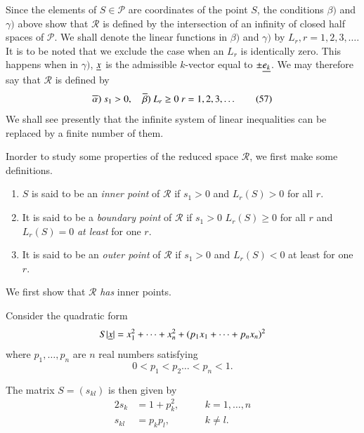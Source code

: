 Since the elements of $S\in\mathscr{P}$ are coordinates of the point
$S$, the conditions $\beta)$ and $\gamma)$ above show that
$\mathscr{R}$ is defined by the intersection of an infinity of closed
half spaces of $\mathscr{P}$. We shall denote the linear functions in
$\beta)$ and $\gamma)$ by $L_{r},r=1,2,3,\ldots$. It is to be noted
that we exclude the case when an $L_{r}$ is identically zero. This
happens when in $\gamma)$, $\underline{x}$ is the admissible $k$-vector equal
to $\pm \underline{e_{k}}$. We may therefore say that $\mathscr{R}$ is
defined by
\begin{equation*}
\overline{\alpha})~s_{1} > 0, \quad \overline{\beta})~L_{r}\geq 0
\ r=1,2,3,\ldots\tag{57}\label{c2:eq57} 
\end{equation*}
We shall see presently that the infinite system of linear inequalities
can be replaced by a finite number of them.

In\pageoriginale order to study some properties of the reduced space
$\mathscr{R}$, we first make some definitions.

\begin{defi*}
\begin{enumerate}
\renewcommand{\theenumi}{\roman{enumi}}
\renewcommand{\labelenumi}{\theenumi)}
\item $S$ is said to be an {\em inner point} of $\mathscr{R}$ if
  $s_{1}>0$ and $L_{r}(S)>0$ for all $r$.

\item It is said to be a {\em boundary point} of $\mathscr{R}$ if
  $s_{1}>0$ $L_{r}(S)\geq 0$ for all $r$ and $L_{r}(S)=0$ {\em at
  least} for one $r$.

\item It is said to be an {\em outer point} of $\mathscr{R}$ if
  $s_{1}>0$ and $L_{r}(S)<0$ at least for one $r$.
\end{enumerate}
\end{defi*}

We first show that $\mathscr{R}$ {\em has} inner points.

Consider the quadratic form 
$$
S|\underline{x}|=x_{1}^{2}+\cdots+x_{n}^{2}+(p_{1}x_{1}+\cdots+p_{n}x_{n})^{2}
$$
where $p_{1},\ldots,p_{n}$ are $n$ real numbers satisfying
$$
0<p_{1}<p_{2}\ldots <p_{n}<1.
$$

The matrix $S=(s_{kl})$ is then given by
\begin{alignat*}{2}
s_{k} &= 1+p_{k}^{2}, & &  \quad k=1,\ldots,n\\
s_{kl} &= p_{k}p_{l}, & & \quad k\neq l.
\end{alignat*}

